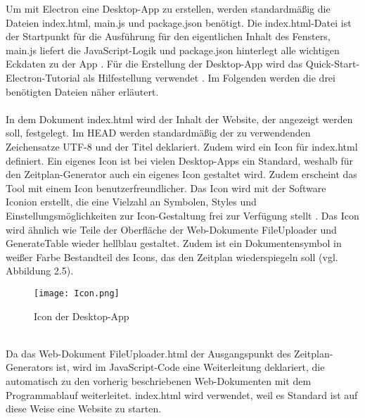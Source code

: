 Um mit Electron eine Desktop-App zu erstellen, werden standardmäßig die Dateien index.html, main.js und package.json benötigt. Die index.html-Datei ist der Startpunkt für die Ausführung für den eigentlichen Inhalt des Fensters, main.js liefert die JavaScript-Logik und package.json hinterlegt alle wichtigen Eckdaten zu der App \cite{electron}. Für die Erstellung der Desktop-App wird das Quick-Start-Electron-Tutorial als Hilfestellung verwendet \cite{electron2}. Im Folgenden werden die drei benötigten Dateien näher erläutert.\\
\\
In dem Dokument index.html wird der Inhalt der Website, der angezeigt werden soll, festgelegt.
Im HEAD werden standardmäßig der zu verwendenden Zeichensatze UTF-8 und der Titel deklariert. Zudem wird ein Icon für index.html definiert. Ein eigenes Icon ist bei vielen Desktop-Apps ein Standard, weshalb für den Zeitplan-Generator auch ein eigenes Icon gestaltet wird. Zudem erscheint das Tool mit einem Icon benutzerfreundlicher. Das Icon wird mit der Software Iconion erstellt, die eine Vielzahl an Symbolen, Styles und Einstellungsmöglichkeiten zur Icon-Gestaltung frei zur Verfügung stellt \cite{iconion}.  Das Icon wird ähnlich wie Teile der Oberfläche der Web-Dokumente FileUploader und GenerateTable wieder hellblau gestaltet. Zudem ist ein Dokumentensymbol in weißer Farbe Bestandteil des Icons, das den Zeitplan wiederspiegeln soll (vgl. Abbildung 2.5).
\begin{figure}[htbp]
  \centering
  \texttt{[image: Icon.png]}
  \caption{Icon der Desktop-App}
  \label{fig:Fig1}
\end{figure}\\
Da das Web-Dokument FileUploader.html der Ausgangspunkt des Zeitplan-Generators ist, wird im JavaScript-Code eine Weiterleitung deklariert, die automatisch zu den vorherig beschriebenen Web-Dokumenten mit dem Programmablauf weiterleitet. index.html wird verwendet, weil es Standard ist auf diese Weise eine Website zu starten. \\
